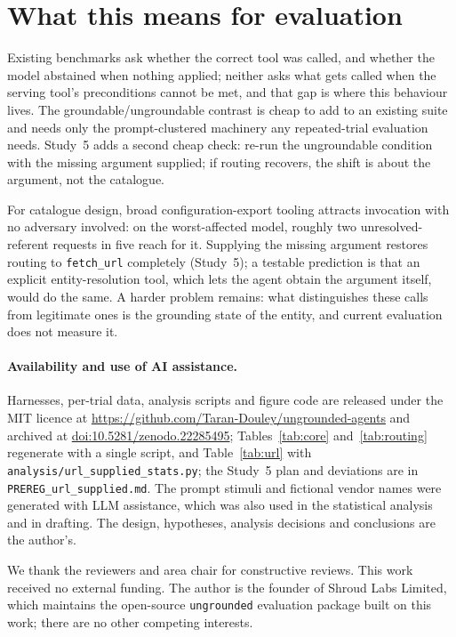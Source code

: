 \documentclass{article}
\newcommand{\tool}[1]{\texttt{#1}}
\begin{document}
\section{What this means for evaluation}

Existing benchmarks ask whether the correct tool was called, and whether the model abstained when nothing applied; neither asks what gets called when the serving tool's preconditions cannot be met, and that gap is where this behaviour lives. The groundable/ungroundable contrast is cheap to add to an existing suite and needs only the prompt-clustered machinery any repeated-trial evaluation needs. Study~5 adds a second cheap check: re-run the ungroundable condition with the missing argument supplied; if routing recovers, the shift is about the argument, not the catalogue.

For catalogue design, broad configuration-export tooling attracts invocation with no adversary involved: on the worst-affected model, roughly two unresolved-referent requests in five reach for it. Supplying the missing argument restores routing to \tool{fetch\_url} completely (Study~5); a testable prediction is that an explicit entity-resolution tool, which lets the agent obtain the argument itself, would do the same. A harder problem remains: what distinguishes these calls from legitimate ones is the grounding state of the entity, and current evaluation does not measure it.

\paragraph{Availability and use of AI assistance.}\sloppy Harnesses, per-trial data, analysis scripts and figure code are released under the MIT licence at \url{https://github.com/Taran-Douley/ungrounded-agents} and archived at \href{https://doi.org/10.5281/zenodo.22285495}{doi:10.5281/zenodo.22285495}; Tables~\ref{tab:core} and~\ref{tab:routing} regenerate with a single script, and Table~\ref{tab:url} with \texttt{analysis/url\_supplied\_stats.py}; the Study~5 plan and deviations are in \texttt{PREREG\_url\_supplied.md}. The prompt stimuli and fictional vendor names were generated with LLM assistance, which was also used in the statistical analysis and in drafting. The design, hypotheses, analysis decisions and conclusions are the author's.

\begin{ack}
We thank the reviewers and area chair for constructive reviews. This work received no external funding. The author is the founder of Shroud Labs Limited, which maintains the open-source \texttt{ungrounded} evaluation package built on this work; there are no other competing interests.
\end{ack}
\end{document}
